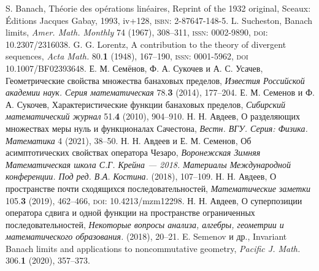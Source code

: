 \documentclass[a4paper,14pt]{article}
\begin{document}
\begin{thebibliography}{99}\small{
{}
S. Banach, Th\'eorie des op\'erations lin\'eaires, Reprint of the 1932 original, Sceaux: \'Editions Jacques Gabay,
1993, iv+128, \textsc{isbn}: 2-87647-148-5.
{}
L. Sucheston, Banach limits, \emph{Amer. Math. Monthly} 74 (1967), 308--311, \textsc{issn}: 0002-9890,
\textsc{doi}: {10.2307/2316038}.
{}
G. G. Lorentz, A contribution to the theory of divergent sequences, \emph{Acta Math.} 80.\textbf{1}
(1948), 167--190, \textsc{issn}: 0001-5962, \textsc{doi} {10.1007/BF02393648}.
{}
Е. М. Семёнов, Ф. А. Сукочев и А. С. Усачев, Геометрические свойства множества банаховых пределов,
\emph{Известия Российской академии наук. Серия математическая} 78.\textbf{3} (2014), 177--204.
{}
Е. М. Семенов и Ф. А. Сукочев, Характеристические функции банаховых пределов, \emph{Сибирский
математический журнал} 51.\textbf{4} (2010), 904--910.
{}
Н. Н. Авдеев, О разделяющих множествах меры нуль и функционалах Сачестона, \emph{Вестн. ВГУ. Серия:
Физика. Математика} 4 (2021), 38--50.
{}
Н. Н. Авдеев и Е. М. Семенов, Об асимптотических свойствах оператора Чезаро, \emph{Воронежская
Зимняя Математическая школа С.Г. Крейна --- 2018. Материалы Международной конференции. Под ред. В.А.
Костина.} (2018), 107--109.{}
Н. Н. Авдеев, О пространстве почти сходящихся последовательностей, \emph{Математические заметки}
105.\textbf{3} (2019), 462--466, \textsc{doi}: {10.4213/mzm12298}.
{}
Н. Н. Авдеев, О суперпозиции оператора сдвига и одной функции на пространстве ограниченных
последовательностей, \emph{Некоторые вопросы анализа, алгебры, геометрии и математического
образования.} (2018), 20--21.
{}
E. Semenov и др., Invariant Banach limits and applications to noncommutative geometry, \emph{Pacific J. Math.}
306.\textbf{1} (2020), 357--373.
}\end{thebibliography}
\end{document}
